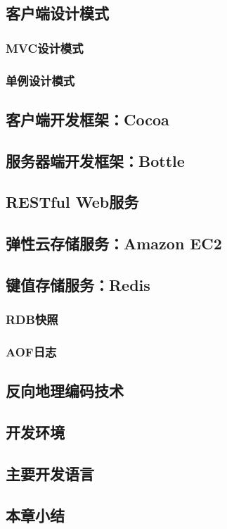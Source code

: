 \documentclass{article}
\begin{document}
\begin{CJK}{UTF8}{gbsn}
	\subsection{客户端设计模式}
	\subsubsection{MVC设计模式}
	\subsubsection{单例设计模式}
	\subsection{客户端开发框架：Cocoa}
	\subsection{服务器端开发框架：Bottle}
	\subsection{RESTful Web服务}
	\subsection{弹性云存储服务：Amazon EC2}
	\subsection{键值存储服务：Redis}
	\subsubsection{RDB快照}
	\subsubsection{AOF日志}
	\subsection{反向地理编码技术}
	\subsection{开发环境}
	\subsection{主要开发语言}
	\subsection{本章小结}


\end{CJK}
\end{document}

